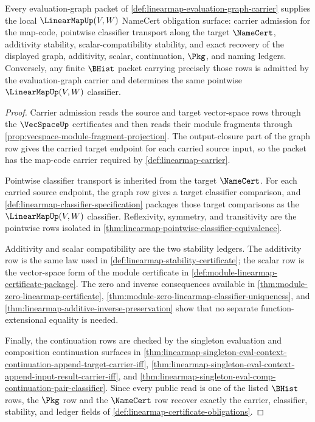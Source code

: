 \begin{theorem}
\label{thm:linearmap-evaluation-graph-namecert-obligations}
Every evaluation-graph packet of \autoref{def:linearmap-evaluation-graph-carrier} supplies the local $\LinearMapUp(V,W)$ NameCert obligation surface: carrier admission for the map-code, pointwise classifier transport along the target $\NameCert$, additivity stability, scalar-compatibility stability, and exact recovery of the displayed graph, additivity, scalar, continuation, $\Pkg$, and naming ledgers. Conversely, any finite $\BHist$ packet carrying precisely those rows is admitted by the evaluation-graph carrier and determines the same pointwise $\LinearMapUp(V,W)$ classifier.
\end{theorem}
\begin{proof}
Carrier admission reads the source and target vector-space rows through the $\VecSpaceUp$ certificates and then reads their module fragments through \autoref{prop:vecspace-module-fragment-projection}. The output-closure part of the graph row gives the carried target endpoint for each carried source input, so the packet has the map-code carrier required by \autoref{def:linearmap-carrier}.

Pointwise classifier transport is inherited from the target $\NameCert$. For each carried source endpoint, the graph row gives a target classifier comparison, and \autoref{def:linearmap-classifier-specification} packages those target comparisons as the $\LinearMapUp(V,W)$ classifier. Reflexivity, symmetry, and transitivity are the pointwise rows isolated in \autoref{thm:linearmap-pointwise-classifier-equivalence}.

Additivity and scalar compatibility are the two stability ledgers. The additivity row is the same law used in \autoref{def:linearmap-stability-certificate}; the scalar row is the vector-space form of the module certificate in \autoref{def:module-linearmap-certificate-package}. The zero and inverse consequences available in \autoref{thm:module-zero-linearmap-certificate}, \autoref{thm:module-zero-linearmap-classifier-uniqueness}, and \autoref{thm:linearmap-additive-inverse-preservation} show that no separate function-extensional equality is needed.

Finally, the continuation rows are checked by the singleton evaluation and composition continuation surfaces in \autoref{thm:linearmap-singleton-eval-context-continuation-append-target-carrier-iff}, \autoref{thm:linearmap-singleton-eval-context-append-input-result-carrier-iff}, and \autoref{thm:linearmap-singleton-eval-comp-continuation-pair-classifier}. Since every public read is one of the listed $\BHist$ rows, the $\Pkg$ row and the $\NameCert$ row recover exactly the carrier, classifier, stability, and ledger fields of \autoref{def:linearmap-certificate-obligations}.
\end{proof}

